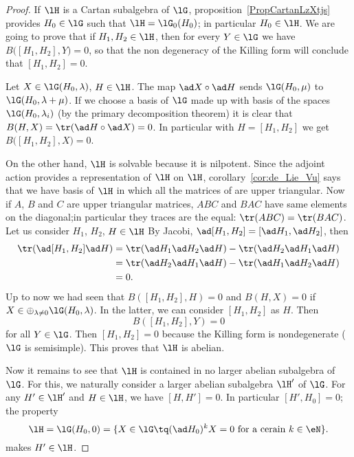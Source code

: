 \begin{proof}
    If \( \lH\) is a Cartan subalgebra of \( \lG\), proposition~\ref{PropCartanLzXtjs} provides \( H_0\in\lG\) such that \( \lH=\lG_0(H_0)\); in particular \( H_0\in\lH\). We are going to prove that if \( H_1,H_2\in\lH\), then for every \( Y\in\lG\) we have \( B\big( [H_1,H_2],Y \big)=0\), so that the non degeneracy of the Killing form will conclude that \( [H_1,H_2]=0\).


    Let $X\in\lG(H_0,\lambda)$, $H\in\lH$. The map $\ad X\circ\ad H$ sends $\lG(H_0,\mu)$ to $\lG(H_0,\lambda+\mu)$. If we choose a basis of $\lG$ made up with basis of the spaces $\lG(H_0,\lambda_i)$ (by the primary decomposition theorem) it is clear that $B(H,X)=\tr(\ad H\circ\ad X)=0$. In particular with \( H=[H_1,H_2]\) we get \( B\big( [H_1,H_2],X \big)=0\).

    On the other hand, $\lH$ is solvable because it is nilpotent. Since the adjoint action provides a representation of \( \lH\) on \( \lH\), corollary~\ref{cor:de_Lie_Vu} says that we have  basis of $\lH$ in which all the matrices of are upper triangular. Now if $A$, $B$ and $C$ are upper triangular matrices, $ABC$ and $BAC$ have same elements on the diagonal;in particular they traces are the equal: $\tr(ABC)=\tr(BAC)$. Let us consider $H_1$, $H_2$, $H\in\lH$ By Jacobi, $\ad[H_1,H_2]=[\ad H_1,\ad H_2]$, then
    \begin{equation}
    \begin{split}
    \tr(\ad[H_1,H_2]\ad H)&=\tr(\ad H_1\ad H_2\ad H)-\tr(\ad H_2\ad H_1\ad H)\\
    &=\tr(\ad H_2\ad H_1\ad H)-\tr(\ad H_1\ad H_2\ad H)\\
    &=0.
    \end{split}
    \end{equation}
    Up to now we had seen that $B([H_1,H_2],H)=0$ and $B(H,X)=0$ if $X\in\oplus_{\lambda\neq 0}\lG(H_0,\lambda)$. In the latter, we can consider $[H_1,H_2]$ as $H$. Then
    \[
    B([H_1,H_2],Y)=0
    \]
    for all $Y\in\lG$. Then $[H_1,H_2]=0$ because the Killing form is nondegenerate ($\lG$ is semisimple). This proves that $\lH$ is abelian.

    Now it remains to see that $\lH$ is contained in no larger abelian subalgebra of $\lG$. For this, we naturally consider a larger abelian subalgebra $\lH'$ of $\lG$. For any $H'\in\lH'$ and $H\in\lH$, we have $[H,H']=0$. In particular $[H',H_0]=0$; the property
    \[
    \lH=\lG(H_0,0)=\{X\in\lG\tq (\ad H_0)^kX=0\text{ for a cerain }k\in\eN\}.
    \]
    makes $H'\in\lH$.
\end{proof}


